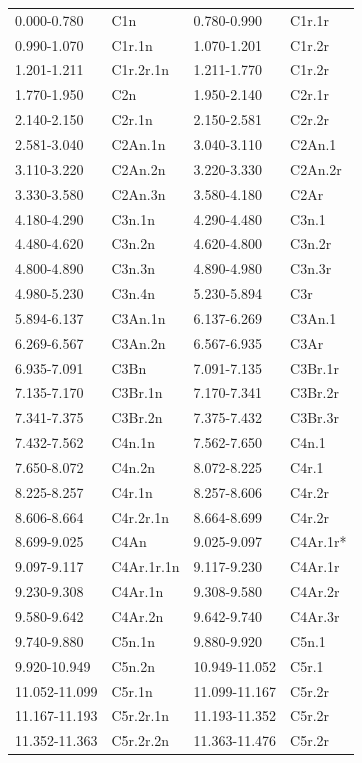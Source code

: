 \begin{center}
\begin{longtable}{ll|ll}
0.000-0.780 &  C1n & 0.780-0.990 &  C1r.1r\\
0.990-1.070 & C1r.1n & 1.070-1.201 & C1r.2r\\
1.201-1.211 & C1r.2r.1n & 1.211-1.770 & C1r.2r\\
1.770-1.950 & C2n & 1.950-2.140 & C2r.1r\\
2.140-2.150 & C2r.1n & 2.150-2.581 & C2r.2r\\ 
2.581-3.040 & C2An.1n & 3.040-3.110 & C2An.1 \\
3.110-3.220 & C2An.2n & 3.220-3.330 & C2An.2r\\
3.330-3.580 & C2An.3n & 3.580-4.180 & C2Ar\\
4.180-4.290 & C3n.1n & 4.290-4.480 & C3n.1\\
4.480-4.620 & C3n.2n & 4.620-4.800 & C3n.2r\\
4.800-4.890 & C3n.3n & 4.890-4.980 & C3n.3r\\
4.980-5.230 & C3n.4n & 5.230-5.894 & C3r\\
5.894-6.137 & C3An.1n & 6.137-6.269 & C3An.1 \\
6.269-6.567 & C3An.2n & 6.567-6.935 & C3Ar\\
6.935-7.091 & C3Bn & 7.091-7.135 & C3Br.1r\\
7.135-7.170 & C3Br.1n & 7.170-7.341 & C3Br.2r\\
7.341-7.375 & C3Br.2n & 7.375-7.432 & C3Br.3r\\
7.432-7.562 & C4n.1n & 7.562-7.650 & C4n.1\\
7.650-8.072 & C4n.2n & 8.072-8.225 & C4r.1\\
8.225-8.257 & C4r.1n & 8.257-8.606 & C4r.2r\\
8.606-8.664 & C4r.2r.1n & 8.664-8.699 & C4r.2r\\
8.699-9.025 & C4An & 9.025-9.097 & C4Ar.1r*\\
9.097-9.117 & C4Ar.1r.1n & 9.117-9.230 & C4Ar.1r\\
9.230-9.308 & C4Ar.1n & 9.308-9.580 & C4Ar.2r\\
9.580-9.642 & C4Ar.2n & 9.642-9.740 & C4Ar.3r\\
9.740-9.880 & C5n.1n & 9.880-9.920 & C5n.1\\
9.920-10.949 & C5n.2n & 10.949-11.052 & C5r.1\\
11.052-11.099 & C5r.1n &  11.099-11.167 & C5r.2r\\
11.167-11.193 & C5r.2r.1n & 11.193-11.352 & C5r.2r\\
11.352-11.363 & C5r.2r.2n & 11.363-11.476 & C5r.2r\\

\end{longtable}
\end{center}
